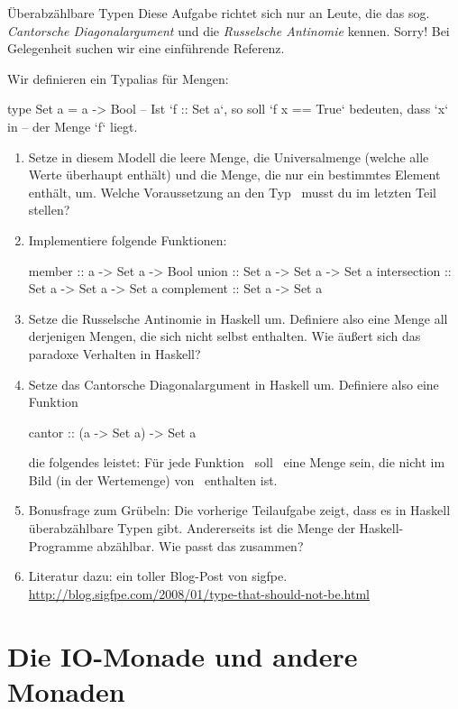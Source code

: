 \documentclass{uebblatt}
\begin{document}
\begin{aufgabe}{Überabzählbare Typen}
Diese Aufgabe richtet sich nur an Leute, die das sog. \emph{Cantorsche
Diagonalargument} und die \emph{Russelsche Antinomie} kennen. Sorry! Bei
Gelegenheit suchen wir eine einführende Referenz.

Wir definieren ein Typalias für Mengen:
\begin{haskellcode}
type Set a = a -> Bool
-- Ist `f :: Set a`, so soll `f x == True` bedeuten, dass `x` in
-- der Menge `f` liegt.
\end{haskellcode}
\begin{enumerate}
\item Setze in diesem Modell die leere Menge, die Universalmenge (welche alle
Werte überhaupt enthält) und die Menge, die nur ein bestimmtes Element enthält,
um. Welche Voraussetzung an den Typ~ musst du im letzten Teil
stellen?
\item Implementiere folgende Funktionen:
\begin{haskellcode}
member       :: a     -> Set a -> Bool
union        :: Set a -> Set a -> Set a
intersection :: Set a -> Set a -> Set a
complement   :: Set a -> Set a
\end{haskellcode}
\item Setze die Russelsche Antinomie in Haskell um. Definiere also eine Menge
all derjenigen Mengen, die sich nicht selbst enthalten. Wie äußert sich das
paradoxe Verhalten in Haskell?
\item Setze das Cantorsche Diagonalargument in Haskell um. Definiere also eine
Funktion
\begin{haskellcode}
cantor :: (a -> Set a) -> Set a
\end{haskellcode}
die folgendes leistet: Für jede Funktion~
soll~ eine Menge sein, die nicht im Bild (in der
Wertemenge) von~ enthalten ist.
\item Bonusfrage zum Grübeln: Die vorherige Teilaufgabe zeigt, dass es in
Haskell überabzählbare Typen gibt. Andererseits ist die Menge der
Haskell-Programme abzählbar. Wie passt das zusammen?
\item Literatur dazu: ein toller Blog-Post von sigfpe.
\url{http://blog.sigfpe.com/2008/01/type-that-should-not-be.html}
\end{enumerate}
\end{aufgabe}


\section{Die IO-Monade und andere Monaden}
\end{document}

